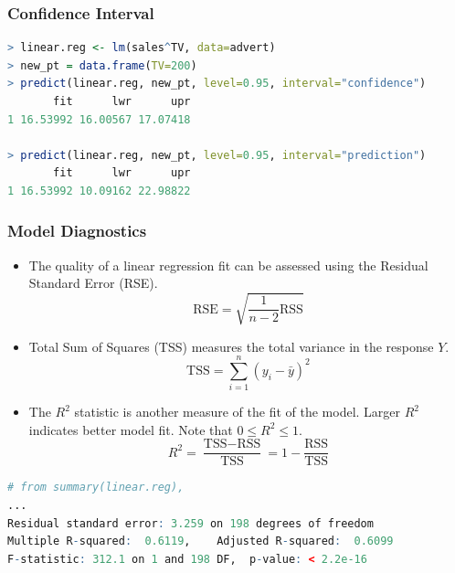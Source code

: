 \documentclass{article}
\begin{document}
\subsubsection{Confidence Interval}
\begin{lstlisting}[language=R]
> linear.reg <- lm(sales^TV, data=advert)
> new_pt = data.frame(TV=200)
> predict(linear.reg, new_pt, level=0.95, interval="confidence")
       fit      lwr      upr
1 16.53992 16.00567 17.07418

> predict(linear.reg, new_pt, level=0.95, interval="prediction")
       fit      lwr      upr
1 16.53992 10.09162 22.98822

\end{lstlisting}

\subsubsection{Model Diagnostics}
\begin{itemize}
    \item The quality of a linear regression fit can be assessed using the Residual Standard Error (RSE).
$$\text{RSE} = \sqrt{\frac{1}{n-2} \text{RSS}}$$

\item Total Sum of Squares (TSS) measures the total variance in the response $Y$.
$$\text{TSS} = \sum_{i=1}^{n} (y_i - \bar{y})^2$$

\item The $R^2 $ statistic is another measure of the fit of the model. Larger $R^2$ indicates better model fit. Note that $0 \leq R^2 \leq 1$.
$$R^2 = \frac{\text{TSS} - \text{RSS}}{\text{TSS}} = 1- \frac{\text{RSS}}{\text{TSS}}$$
\end{itemize}
\begin{lstlisting}[language = R]
# from summary(linear.reg),
...
Residual standard error: 3.259 on 198 degrees of freedom
Multiple R-squared:  0.6119,    Adjusted R-squared:  0.6099 
F-statistic: 312.1 on 1 and 198 DF,  p-value: < 2.2e-16
\end{lstlisting}
\end{document}
